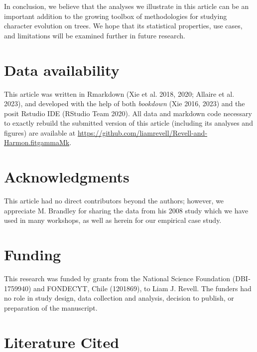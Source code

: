 \documentclass[fleqn,10pt,lineno]{wlpeerj} %
\begin{document}
In conclusion, we believe that the analyses we illustrate in this article can be an important addition to the growing toolbox of methodologies for studying character evolution on trees. We hope that its statistical properties, use cases, and limitations will be examined further in future research.

\section{Data availability}\label{data-availability}

This article was written in Rmarkdown (Xie et al. 2018, 2020; Allaire et al. 2023), and developed with the help of both \emph{bookdown} (Xie 2016, 2023) and the posit Rstudio IDE (RStudio Team 2020). All data and markdown code necessary to exactly rebuild the submitted version of this article (including its analyses and figures) are available at \url{https://github.com/liamrevell/Revell-and-Harmon.fitgammaMk}.

\section{Acknowledgments}\label{acknowledgments}

This article had no direct contributors beyond the authors; however, we appreciate M. Brandley for sharing the data from his 2008 study which we have used in many workshops, as well as herein for our empirical case study.

\section{Funding}\label{funding}

This research was funded by grants from the National Science Foundation (DBI‐1759940) and FONDECYT, Chile (1201869), to Liam J. Revell. The funders had no role in study design, data collection and analysis, decision to publish, or preparation of the manuscript.

\section*{Literature Cited}\label{literature-cited}
\end{document}
